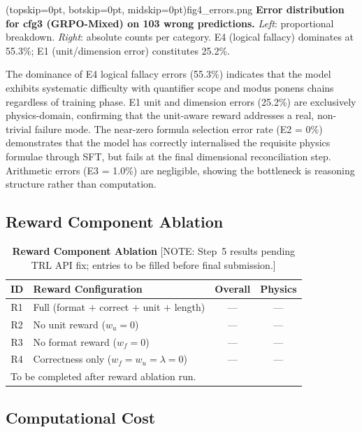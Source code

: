 \documentclass{ieeeaccess}
\begin{document}
\Figure[t!](topskip=0pt, botskip=0pt, midskip=0pt){fig4_errors.png}{%
  \textbf{Error distribution for cfg3 (GRPO-Mixed) on 103 wrong
  predictions.}
  \emph{Left}: proportional breakdown.
  \emph{Right}: absolute counts per category.
  E4 (logical fallacy) dominates at 55.3\%;
  E1 (unit/dimension error) constitutes 25.2\%.
  \label{fig:errors}}

The dominance of E4 logical fallacy errors (55.3\%) indicates that
the model exhibits systematic difficulty with quantifier scope and
modus ponens chains regardless of training phase.
E1 unit and dimension errors (25.2\%) are exclusively physics-domain,
confirming that the unit-aware reward addresses a real, non-trivial
failure mode.
The near-zero formula selection error rate (E2 = 0\%) demonstrates
that the model has correctly internalised the requisite physics formulae
through SFT, but fails at the final dimensional reconciliation step.
Arithmetic errors (E3 = 1.0\%) are negligible, showing the bottleneck
is reasoning structure rather than computation.

\subsection{Reward Component Ablation}

\begin{table}[t]
\caption{\textbf{Reward Component Ablation}
  {\small [NOTE: Step~5 results pending TRL API fix;
  entries to be filled before final submission.]}}
\label{tab:reward_ablation}
\centering
\setlength{\tabcolsep}{4pt}
\begin{tabular}{clcc}
\toprule
\textbf{ID} & \textbf{Reward Configuration}
  & \textbf{Overall} & \textbf{Physics} \\
\midrule
R1 & Full (format $+$ correct $+$ unit $+$ length) & --- & --- \\
R2 & No unit reward ($w_u=0$)                       & --- & --- \\
R3 & No format reward ($w_f=0$)                     & --- & --- \\
R4 & Correctness only ($w_f=w_u=\lambda=0$)          & --- & --- \\
\bottomrule
\multicolumn{4}{l}{\footnotesize To be completed after reward ablation run.}
\end{tabular}
\end{table}

\subsection{Computational Cost}
\end{document}
